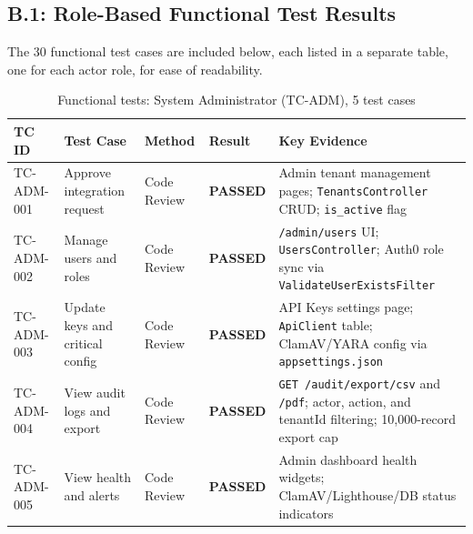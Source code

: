 \subsection*{B.1: Role-Based Functional Test Results}

The 30 functional test cases are included below, each listed in a separate table, one for each actor role, for ease of readability.

\begin{table}[H]
  \centering
  \smalltable
  \footnotesize
  {%
  \setlength{\tabcolsep}{4pt}
  \renewcommand{\arraystretch}{1.3}
  \begin{tabular}{|>{\raggedright\arraybackslash}p{}|
                  >{\raggedright\arraybackslash}p{}|
                  >{\raggedright\arraybackslash}p{}|
                  >{\centering\arraybackslash}p{}|
                  >{\raggedright\arraybackslash}p{}|}
    \hline
    \textbf{TC ID} & \textbf{Test Case} & \textbf{Method} & \textbf{Result} & \textbf{Key Evidence} \\
    \hline\hline
    TC-ADM-001 & Approve integration request & Code Review & \textbf{PASSED} & Admin tenant management pages; \texttt{TenantsController} CRUD; \texttt{is\_active} flag \\
    \hline
    TC-ADM-002 & Manage users and roles & Code Review & \textbf{PASSED} & \texttt{/admin/users} UI; \texttt{UsersController}; Auth0 role sync via \texttt{ValidateUserExistsFilter} \\
    \hline
    TC-ADM-003 & Update keys and critical config & Code Review & \textbf{PASSED} & API Keys settings page; \texttt{ApiClient} table; ClamAV/YARA config via \texttt{appsettings.json} \\
    \hline
    TC-ADM-004 & View audit logs and export & Code Review & \textbf{PASSED} & \texttt{GET /audit/export/csv} and \texttt{/pdf}; actor, action, and tenantId filtering; 10,000-record export cap \\
    \hline
    TC-ADM-005 & View health and alerts & Code Review & \textbf{PASSED} & Admin dashboard health widgets; ClamAV/Lighthouse/DB status indicators \\
    \hline
  \end{tabular}
  }%
  \captionsetup{type=table}
  \caption{Functional tests: System Administrator (TC-ADM), 5 test cases}
  \label{tab:func-adm}
\end{table}

